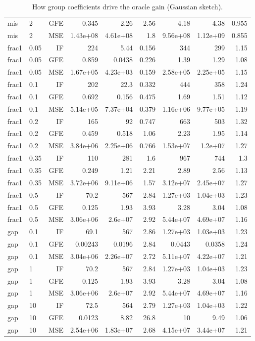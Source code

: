 \begin{table}[t]
\begin{tabular}{llrrrrrrr}
mis & 2 & GFE & 0.345 & 2.26 & 2.56 & 4.18 & 4.38 & 0.955 \\
mis & 2 & MSE & 1.43e+08 & 4.61e+08 & 1.8 & 9.56e+08 & 1.12e+09 & 0.855 \\
\midrule
frac1 & 0.05 & IF & 224 & 5.44 & 0.156 & 344 & 299 & 1.15 \\
frac1 & 0.05 & GFE & 0.859 & 0.0438 & 0.226 & 1.39 & 1.29 & 1.08 \\
frac1 & 0.05 & MSE & 1.67e+05 & 4.23e+03 & 0.159 & 2.58e+05 & 2.25e+05 & 1.15 \\
frac1 & 0.1 & IF & 202 & 22.3 & 0.332 & 444 & 358 & 1.24 \\
frac1 & 0.1 & GFE & 0.692 & 0.156 & 0.475 & 1.69 & 1.51 & 1.12 \\
frac1 & 0.1 & MSE & 5.14e+05 & 7.37e+04 & 0.379 & 1.16e+06 & 9.77e+05 & 1.19 \\
frac1 & 0.2 & IF & 165 & 92 & 0.747 & 663 & 503 & 1.32 \\
frac1 & 0.2 & GFE & 0.459 & 0.518 & 1.06 & 2.23 & 1.95 & 1.14 \\
frac1 & 0.2 & MSE & 3.84e+06 & 2.25e+06 & 0.766 & 1.53e+07 & 1.2e+07 & 1.27 \\
frac1 & 0.35 & IF & 110 & 281 & 1.6 & 967 & 744 & 1.3 \\
frac1 & 0.35 & GFE & 0.249 & 1.21 & 2.21 & 2.89 & 2.56 & 1.13 \\
frac1 & 0.35 & MSE & 3.72e+06 & 9.11e+06 & 1.57 & 3.12e+07 & 2.45e+07 & 1.27 \\
frac1 & 0.5 & IF & 70.2 & 567 & 2.84 & 1.27e+03 & 1.04e+03 & 1.23 \\
frac1 & 0.5 & GFE & 0.125 & 1.93 & 3.93 & 3.28 & 3.04 & 1.08 \\
frac1 & 0.5 & MSE & 3.06e+06 & 2.6e+07 & 2.92 & 5.44e+07 & 4.69e+07 & 1.16 \\
\midrule
gap & 0.1 & IF & 69.1 & 567 & 2.86 & 1.27e+03 & 1.03e+03 & 1.23 \\
gap & 0.1 & GFE & 0.00243 & 0.0196 & 2.84 & 0.0443 & 0.0358 & 1.24 \\
gap & 0.1 & MSE & 3.04e+06 & 2.26e+07 & 2.72 & 5.11e+07 & 4.22e+07 & 1.21 \\
gap & 1 & IF & 70.2 & 567 & 2.84 & 1.27e+03 & 1.04e+03 & 1.23 \\
gap & 1 & GFE & 0.125 & 1.93 & 3.93 & 3.28 & 3.04 & 1.08 \\
gap & 1 & MSE & 3.06e+06 & 2.6e+07 & 2.92 & 5.44e+07 & 4.69e+07 & 1.16 \\
gap & 10 & IF & 72.5 & 564 & 2.79 & 1.27e+03 & 1.04e+03 & 1.22 \\
gap & 10 & GFE & 0.0123 & 8.82 & 26.8 & 10 & 9.49 & 1.06 \\
gap & 10 & MSE & 2.54e+06 & 1.83e+07 & 2.68 & 4.15e+07 & 3.44e+07 & 1.21 \\
\bottomrule
\end{tabular}
\caption{How group coefficients drive the oracle gain (Gaussian sketch).}
\label{tab:s5_beta}
\end{table}